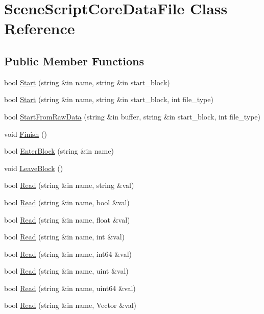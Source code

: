 \hypertarget{class_scene_script_core_data_file}{}\section{Scene\+Script\+Core\+Data\+File Class Reference}
\label{class_scene_script_core_data_file}
\subsection*{Public Member Functions}
\begin{DoxyCompactItemize}
\item 
bool \hyperlink{class_scene_script_core_data_file_ad8bcdfe2d2d733aad4774a6bc71f056f}{Start} (string \&in name, string \&in start\+\_\+block)
\item 
bool \hyperlink{class_scene_script_core_data_file_a13d8ea5ef149ed86699119782a474652}{Start} (string \&in name, string \&in start\+\_\+block, int file\+\_\+type)
\item 
bool \hyperlink{class_scene_script_core_data_file_a224d64e4494fb6ad200c6b7cb04586b5}{Start\+From\+Raw\+Data} (string \&in buffer, string \&in start\+\_\+block, int file\+\_\+type)
\item 
void \hyperlink{class_scene_script_core_data_file_ad8040ee64763a7fca44af443bfc2911e}{Finish} ()
\item 
bool \hyperlink{class_scene_script_core_data_file_a7f82cc20ea137b18c14f1c8c95f3addd}{Enter\+Block} (string \&in name)
\item 
void \hyperlink{class_scene_script_core_data_file_a7c7903602f39ac0ef03cb43d0e822319}{Leave\+Block} ()
\item 
bool \hyperlink{class_scene_script_core_data_file_a04c0d73897afa43c06f38e929f3b0e80}{Read} (string \&in name, string \&val)
\item 
bool \hyperlink{class_scene_script_core_data_file_a3f37a8d264ad2171202aa3155cf403ef}{Read} (string \&in name, bool \&val)
\item 
bool \hyperlink{class_scene_script_core_data_file_a6caf7b53cead7896f1dea14f72a16e54}{Read} (string \&in name, float \&val)
\item 
bool \hyperlink{class_scene_script_core_data_file_a85ba435b8992662256908a2093cce606}{Read} (string \&in name, int \&val)
\item 
bool \hyperlink{class_scene_script_core_data_file_a07169362f213c81778f18087c8f021f8}{Read} (string \&in name, int64 \&val)
\item 
bool \hyperlink{class_scene_script_core_data_file_a7aae22346788135d38266ea03d878cf9}{Read} (string \&in name, uint \&val)
\item 
bool \hyperlink{class_scene_script_core_data_file_af0aa8b6231ac3dede97b87b38863611f}{Read} (string \&in name, uint64 \&val)
\item 
bool \hyperlink{class_scene_script_core_data_file_ad3312cbaf50c5b433162101bd07095de}{Read} (string \&in name, Vector \&val)
\end{DoxyCompactItemize}


